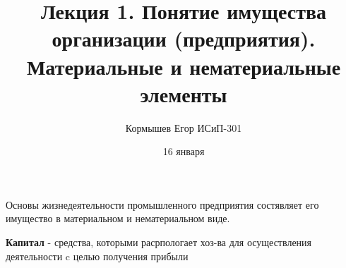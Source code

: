 \documentclass[11pt]{article}
\author{Кормышев Егор ИСиП-301}
\date{16 января}
\title{Лекция 1. Понятие имущества организации (предприятия). Материальные и нематериальные элементы}
\begin{document}
\maketitle
\tableofcontents

Основы жизнедеятельности промышленного предприятия  состявляет его имущество в материальном и нематериальном виде.


\textbf{Капитал} -  средства, которыми расрпологает хоз-ва для осуществления деятельности c целью получения прибыли        
\end{document}
